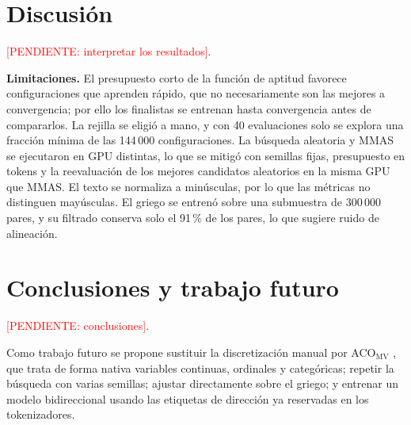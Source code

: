 \documentclass[conference]{IEEEtran}
\newcommand{\pendiente}[1]{\textcolor{red}{[PENDIENTE: #1]}}
\begin{document}
\section{Discusión}

\pendiente{interpretar los resultados}.

\textbf{Limitaciones.} El presupuesto corto de la función de aptitud
favorece configuraciones que aprenden rápido, que no necesariamente son
las mejores a convergencia; por ello los finalistas se entrenan hasta
convergencia antes de compararlos. La rejilla se eligió a mano, y con
40 evaluaciones solo se explora una fracción mínima de las 144\,000
configuraciones. La búsqueda aleatoria y MMAS se ejecutaron en GPU
distintas, lo que se mitigó con semillas fijas, presupuesto en tokens y
la reevaluación de los mejores candidatos aleatorios en la misma GPU que
MMAS. El texto se normaliza a minúsculas, por lo que las métricas no
distinguen mayúsculas. El griego se entrenó sobre una submuestra de
300\,000 pares, y su filtrado conserva solo el 91\,\% de los pares, lo
que sugiere ruido de alineación.

\section{Conclusiones y trabajo futuro}

\pendiente{conclusiones}.

Como trabajo futuro se propone sustituir la discretización manual por
ACO$_\text{MV}$ \cite{liao2014acomv}, que trata de forma nativa variables
continuas, ordinales y categóricas; repetir la búsqueda con varias
semillas; ajustar directamente sobre el griego; y entrenar un modelo
bidireccional usando las etiquetas de dirección ya reservadas en los
tokenizadores.



\end{document}
